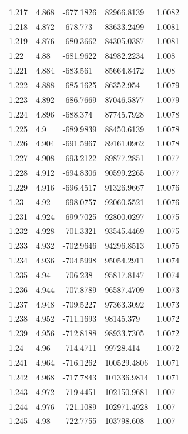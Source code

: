 \begin{tabular}{lllll}
1.217 & 4.868 & -677.1826 & 82966.8139 & 1.0082 \\
1.218 & 4.872 & -678.773 & 83633.2499 & 1.0081 \\
1.219 & 4.876 & -680.3662 & 84305.0387 & 1.0081 \\
1.22 & 4.88 & -681.9622 & 84982.2234 & 1.008 \\
1.221 & 4.884 & -683.561 & 85664.8472 & 1.008 \\
1.222 & 4.888 & -685.1625 & 86352.954 & 1.0079 \\
1.223 & 4.892 & -686.7669 & 87046.5877 & 1.0079 \\
1.224 & 4.896 & -688.374 & 87745.7928 & 1.0078 \\
1.225 & 4.9 & -689.9839 & 88450.6139 & 1.0078 \\
1.226 & 4.904 & -691.5967 & 89161.0962 & 1.0078 \\
1.227 & 4.908 & -693.2122 & 89877.2851 & 1.0077 \\
1.228 & 4.912 & -694.8306 & 90599.2265 & 1.0077 \\
1.229 & 4.916 & -696.4517 & 91326.9667 & 1.0076 \\
1.23 & 4.92 & -698.0757 & 92060.5521 & 1.0076 \\
1.231 & 4.924 & -699.7025 & 92800.0297 & 1.0075 \\
1.232 & 4.928 & -701.3321 & 93545.4469 & 1.0075 \\
1.233 & 4.932 & -702.9646 & 94296.8513 & 1.0075 \\
1.234 & 4.936 & -704.5998 & 95054.2911 & 1.0074 \\
1.235 & 4.94 & -706.238 & 95817.8147 & 1.0074 \\
1.236 & 4.944 & -707.8789 & 96587.4709 & 1.0073 \\
1.237 & 4.948 & -709.5227 & 97363.3092 & 1.0073 \\
1.238 & 4.952 & -711.1693 & 98145.379 & 1.0072 \\
1.239 & 4.956 & -712.8188 & 98933.7305 & 1.0072 \\
1.24 & 4.96 & -714.4711 & 99728.414 & 1.0072 \\
1.241 & 4.964 & -716.1262 & 100529.4806 & 1.0071 \\
1.242 & 4.968 & -717.7843 & 101336.9814 & 1.0071 \\
1.243 & 4.972 & -719.4451 & 102150.9681 & 1.007 \\
1.244 & 4.976 & -721.1089 & 102971.4928 & 1.007 \\
1.245 & 4.98 & -722.7755 & 103798.608 & 1.007 \\

\end{tabular}
